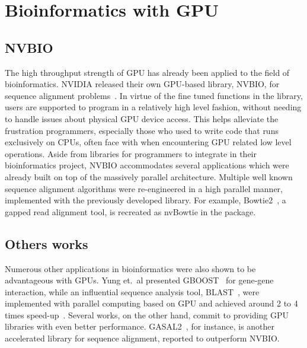 \documentclass{PHlab-thesis}
\begin{document}
\section{Bioinformatics with GPU}
\subsection{NVBIO}
The high throughput strength of GPU has already been applied to the field of bioinformatics. NVIDIA released their own GPU-based library, NVBIO, for sequence alignment problems~\cite{nvbio2015}. In virtue of the fine tuned functions in the library, users are supported to program in a relatively high level fashion, without needing to handle issues about physical GPU device access. This helps alleviate the frustration programmers, especially those who used to write code that runs exclusively on CPUs, often face with when encountering GPU related low level operations. Aside from libraries for programmers to integrate in their bioinformatics project, NVBIO accommodates several applications which were already built on top of the massively parallel architecture. Multiple well known sequence alignment algorithms were re-engineered in a high parallel manner, implemented with the previously developed library. For example, Bowtie2~\cite{langmead2012fast}, a gapped read alignment tool, is recreated as nvBowtie in the package.
\subsection{Others works}
Numerous other applications in bioinformatics were also shown to be advantageous with GPUs. Yung et.\ al presented GBOOST~\cite{yung2011gboost} for gene-gene interaction, while an influential sequence analysis tool, BLAST~\cite{altschul1990basic}, were implemented with parallel computing based on GPU and achieved around 2 to 4 times speed-up~\cite{vouzis2011gpu}. Several works, on the other hand, commit to providing GPU libraries with even better performance. GASAL2~\cite{ahmed2019gasal2}, for instance, is another accelerated library for sequence alignment, reported to outperform NVBIO. 
\end{document}
